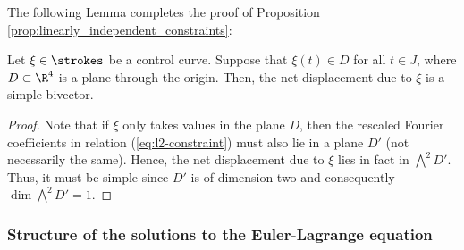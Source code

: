 The following Lemma completes the proof of Proposition \ref{prop:linearly_independent_constraints}:
\begin{lemma}
	Let $\xi \in \strokes$ be a control curve. Suppose that $\xi(t) \in D$ for all $t \in J$, where $D \subset \R^4$ is a plane through the origin. Then, the net displacement due to $\xi$ is a simple bivector.
\end{lemma}

\begin{proof}
Note that if $\xi$ only takes values in the plane $D$, then the rescaled Fourier coefficients in relation (\ref{eq:l2-constraint}) must also lie in a plane $D'$ (not necessarily the same). Hence, the net displacement due to $\xi$ lies in fact in $\bigwedge^2 D'$. Thus, it must be simple since $D'$ is of dimension two and consequently $\dim \bigwedge^2 D' = 1$.
\end{proof}

\subsubsection{Structure of the solutions to the Euler-Lagrange equation}

